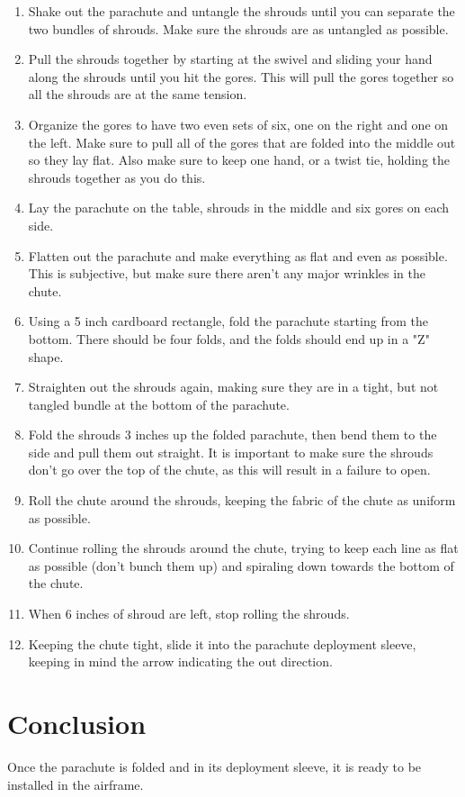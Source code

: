 \documentclass[]{auvsi_doc}
\begin{document}
\begin{enumerate}
	\item Shake out the parachute and untangle the shrouds until you can separate the two bundles of shrouds. Make sure the shrouds are as untangled as possible.
	\item Pull the shrouds together by starting at the swivel and sliding your hand along the shrouds until you hit the gores. This will pull the gores together so all the shrouds are at the same tension.
	\item Organize the gores to have two even sets of six, one on the right and one on the left. Make sure to pull all of the gores that are folded into the middle out so they lay flat. Also make sure to keep one hand, or a twist tie, holding the shrouds together as you do this.
	\item Lay the parachute on the table, shrouds in the middle and six gores on each side. 
	\item Flatten out the parachute and make everything as flat and even as possible. This is subjective, but make sure there aren't any major wrinkles in the chute.
	\item Using a 5 inch cardboard rectangle, fold the parachute starting from the bottom. There should be four folds, and the folds should end up in a "Z" shape.
	\item Straighten out the shrouds again, making sure they are in a tight, but not tangled bundle at the bottom of the parachute.
	\item Fold the shrouds 3 inches up the folded parachute, then bend them to the side and pull them out straight. It is important to make sure the shrouds don't go over the top of the chute, as this will result in a failure to open.
	\item Roll the chute around the shrouds, keeping the fabric of the chute as uniform as possible.
	\item Continue rolling the shrouds around the chute, trying to keep each line as flat as possible (don't bunch them up) and spiraling down towards the bottom of the chute.
	\item When 6 inches of shroud are left, stop rolling the shrouds.
	\item Keeping the chute tight, slide it into the parachute deployment sleeve, keeping in mind the arrow indicating the out direction.
\end{enumerate}

\section*{Conclusion}
Once the parachute is folded and in its deployment sleeve, it is ready to be installed in the airframe.
\end{document}
